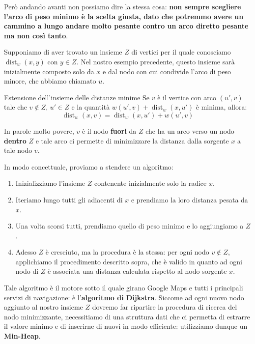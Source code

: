 \documentclass[12pt]{report}
\begin{document}
	Però andando avanti non possiamo dire la stessa cosa: \textbf{non sempre scegliere l'arco di peso minimo è la scelta giusta, dato che potremmo avere un cammino a lungo andare molto pesante contro un arco diretto pesante ma non così tanto}.
	
	Supponiamo di aver trovato un insieme $Z$ di vertici per il quale conosciamo $\operatorname{dist}_w(x, y)$ con $y \in Z$. Nel nostro esempio precedente, questo insieme sarà inizialmente composto solo da $x$ e dal nodo con cui condivide l'arco di peso minore, che abbiamo chiamato $u$.
	
	\begin{proposizione}{Estensione dell'insieme delle distanze minime}{}
		Se $v$ è il vertice con arco $(u', v)$ tale che $v \notin Z$, $u' \in Z$ e la quantità $w(u', v) + \operatorname{dist}_w(x, u')$ è minima, allora:
		\[
		\operatorname{dist}_w(x, v) = \operatorname{dist}_w(x, u') + w(u', v)
		\]
	\end{proposizione}
	
	In parole molto povere, $v$ è il nodo \textbf{fuori} da $Z$ che ha un arco verso un nodo \textbf{dentro} $Z$ e tale arco ci permette di minimizzare la distanza dalla sorgente $x$ a tale nodo $v$.
	
	In modo concettuale, proviamo a stendere un algoritmo:
	\begin{enumerate}
		\item Inizializziamo l'insieme $Z$ contenente inizialmente solo la radice $x$.
		\item Iteriamo lungo tutti gli adiacenti di $x$ e prendiamo la loro distanza pesata da $x$.
		\item Una volta scorsi tutti, prendiamo quello di peso minimo e lo aggiungiamo a $Z$.
		\item Adesso $Z$ è cresciuto, ma la procedura è la stessa: per ogni nodo $v \notin Z$, applichiamo il procedimento descritto sopra, che è valido in quanto ad ogni nodo di $Z$ è associata una distanza calculata rispetto al nodo sorgente $x$.
	\end{enumerate}
	
	Tale algoritmo è il motore sotto il quale girano Google Maps e tutti i principali servizi di navigazione: è l'\textbf{algoritmo di Dijkstra}.
	Siccome ad ogni nuovo nodo aggiunto al nostro insieme $Z$ dovremo far ripartire la procedura di ricerca del nodo minimizzante, necessitiamo di una struttura dati che ci permetta di estrarre il valore minimo e di inserirne di nuovi in modo efficiente: utilizziamo dunque un \textbf{Min-Heap}.
	
\end{document}
